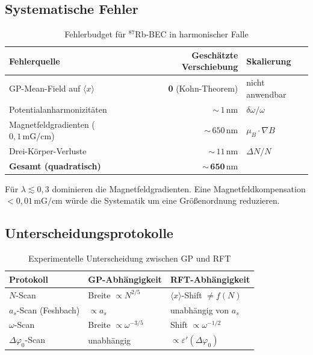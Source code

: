 \documentclass[a4paper,11pt]{article}
\begin{document}
\subsection{Systematische Fehler}

\begin{table}[h]
\centering
\caption{Fehlerbudget für $^{87}$Rb-BEC in harmonischer Falle}
\begin{tabular}{lrl}
\toprule
Fehlerquelle & Geschätzte Verschiebung & Skalierung \\
\midrule
GP-Mean-Field auf $\langle x\rangle$ & \textbf{0} (Kohn-Theorem) & nicht anwendbar \\
Potentialanharmonizitäten & ${\sim}\,1\,\mathrm{nm}$ & $\delta\omega/\omega$ \\
Magnetfeldgradienten ($0{,}1\,\mathrm{mG/cm}$) & ${\sim}\,650\,\mathrm{nm}$ & $\mu_B \cdot \nabla B$ \\
Drei-Körper-Verluste & ${\sim}\,11\,\mathrm{nm}$ & $\Delta N / N$ \\
\midrule
\textbf{Gesamt (quadratisch)} & $\mathbf{{\sim}\,650\,\mathrm{nm}}$ & \\
\bottomrule
\end{tabular}
\end{table}

Für $\lambda \lesssim 0{,}3$ dominieren die Magnetfeldgradienten.
Eine Magnetfeldkompensation $< 0{,}01\,\mathrm{mG/cm}$ würde die
Systematik um eine Größenordnung reduzieren.

\subsection{Unterscheidungsprotokolle}

\begin{table}[h]
\centering
\caption{Experimentelle Unterscheidung zwischen GP und RFT}
\begin{tabular}{lll}
\toprule
Protokoll & GP-Abhängigkeit & RFT-Abhängigkeit \\
\midrule
$N$-Scan & Breite $\propto N^{2/5}$ & $\langle x\rangle$-Shift $\neq f(N)$ \\
$a_s$-Scan (Feshbach) & $\propto a_s$ & unabhängig von $a_s$ \\
$\omega$-Scan & Breite $\propto \omega^{-3/5}$ & Shift $\propto \omega^{-1/2}$ \\
$\Delta\varphi_0$-Scan & unabhängig & $\propto \varepsilon'(\Delta\varphi_0)$ \\
\bottomrule
\end{tabular}
\end{table}
\end{document}
